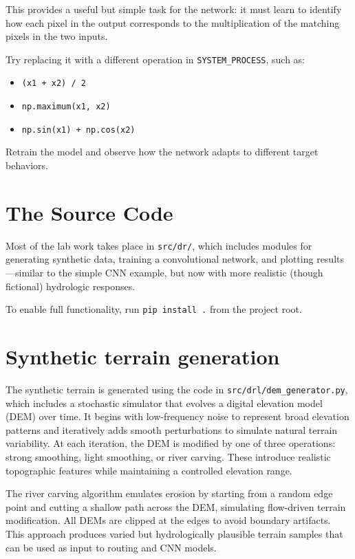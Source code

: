 \documentclass{article}
\begin{document}
This provides a useful but simple task for the network: it must learn to identify how each pixel in the output corresponds to the multiplication of the matching pixels in the two inputs.

Try replacing it with a different operation in \texttt{SYSTEM\_PROCESS}, such as:
\begin{itemize}
  \item \texttt{(x1 + x2) / 2}
  \item \texttt{np.maximum(x1, x2)}
  \item \texttt{np.sin(x1) + np.cos(x2)}
\end{itemize}

Retrain the model and observe how the network adapts to different target behaviors.

\section{The Source Code}
\label{sec:src}

Most of the lab work takes place in \texttt{src/dr/}, which includes modules for generating synthetic data, training a convolutional network, and plotting results—similar to the simple CNN example, but now with more realistic (though fictional) hydrologic responses.

To enable full functionality, run \texttt{pip install .} from the project root. 

\section{Synthetic terrain generation}
\label{sec:terrain}
The synthetic terrain is generated using the code in \texttt{src/drl/dem\_generator.py}, which includes a stochastic simulator that evolves a digital elevation model (DEM) over time. It begins with low-frequency noise to represent broad elevation patterns and iteratively adds smooth perturbations to simulate natural terrain variability. At each iteration, the DEM is modified by one of three operations: strong smoothing, light smoothing, or river carving. These introduce realistic topographic features while maintaining a controlled elevation range.

The river carving algorithm emulates erosion by starting from a random edge point and cutting a shallow path across the DEM, simulating flow-driven terrain modification. All DEMs are clipped at the edges to avoid boundary artifacts. This approach produces varied but hydrologically plausible terrain samples that can be used as input to routing and CNN models.
\end{document}
